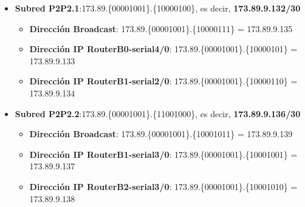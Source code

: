 \begin{itemize}
\begin{itemize}
		\end{itemize}
	\item{\textbf{Subred P2P2.1}:}173.89.\{\textcolor{azul}{000010}\textcolor{rojo}{01}\}.\{\textcolor{rojo}{100001}00\}, es decir, \textbf{173.89.9.132/30}
		\begin{itemize}
			\item{\textbf{Dirección Broadcast}}: 173.89.\{\textcolor{azul}{000010}\textcolor{rojo}{01}\}.\{\textcolor{rojo}{100001}11\} = 173.89.9.135
			\item{\textbf{Dirección IP RouterB0-serial4/0}}: 173.89.\{\textcolor{azul}{000010}\textcolor{rojo}{01}\}.\{\textcolor{rojo}{100001}01\} = 173.89.9.133
			\item{\textbf{Dirección IP RouterB1-serial2/0}}: 173.89.\{\textcolor{azul}{000010}\textcolor{rojo}{01}\}.\{\textcolor{rojo}{100001}10\} = 173.89.9.134
		\end{itemize}
	\item{\textbf{Subred P2P2.2}:}173.89.\{\textcolor{azul}{000010}\textcolor{rojo}{01}\}.\{\textcolor{rojo}{110010}00\}, es decir, \textbf{173.89.9.136/30}
		\begin{itemize}
			\item{\textbf{Dirección Broadcast}}: 173.89.\{\textcolor{azul}{000010}\textcolor{rojo}{01}\}.\{\textcolor{rojo}{100010}11\} = 173.89.9.139
			\item{\textbf{Dirección IP RouterB1-serial3/0}}: 173.89.\{\textcolor{azul}{000010}\textcolor{rojo}{01}\}.\{\textcolor{rojo}{100010}01\} = 173.89.9.137
			\item{\textbf{Dirección IP RouterB2-serial3/0}}: 173.89.\{\textcolor{azul}{000010}\textcolor{rojo}{01}\}.\{\textcolor{rojo}{100010}10\} = 173.89.9.138
		\end{itemize}
\end{itemize}


